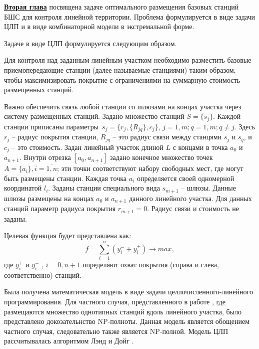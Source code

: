 
  




\underline{\textbf{Вторая глава}} посвящена задаче оптимального размещения базовых станций БШС для контроля линейной территории. Проблема формулируется в виде задачи ЦЛП и в виде комбинаторной модели в экстремальной форме.

Задаче в виде ЦЛП формулируется следующим образом. 

Для контроля над заданным линейным участком необходимо разместить базовые приемопередающие станции (далее называемые станциями) таким образом, чтобы максимизировать покрытие с ограничениями на суммарную стоимость размещенных станций.



Важно обеспечить связь любой станции со шлюзами на концах участка через систему размещенных станций. Задано множество станций $S = \{s_j\}$. Каждой станции приписаны параметры $s_j = \{r_j, \{R_{jq}\}, c_j \}$, $j = \overline{1,m}; q = \overline{1,m}; q \neq j$. Здесь $r_j$ -- радиус покрытия станции, $R_{jq}$ -- это радиус связи между станцями $s_j$ и $s_q$, и $c_j$ -- это стоимость. Задан линейный участок длиной $L$ с концами в точка $a_0$ и $a_{n+1}$. Внутри  отрезка $[a_0, a_{n+1}]$ задано конечное множество точек $A=\{a_i\}, i=\overline{1,n}$; эти точки соответствуют набору свободных мест, где могут быть размещены станции. Каждая точка $a_i$ определяется своей одномерной координатой $l_i$. Заданы станции специального вида $s_{m+1}$ -- шлюзы. Данные шлюзы размещены на концах $a_0$ и $a_{n+1}$ данного линейного участка. Для данных станций параметр радиуса покрытия $r_{m+1}=0$. Радиус связи и стоимость не заданы.

Целевая функция будет представлена как:
$$
  f =  \sum\limits_{i=1}^n (y_i^- + y_i^+) \rightarrow max,
$$
где $y_i^+$ и $y_i^-$ , $i= \overline{0,n+1}$ определяют охват покрытия (справа и слева, соответственно) станций.

Была получена математическая модель в виде задачи целлочисленного-линейного программирования. Для частного случая, представленного в работе \cite{Ivanov2018}, где размещаются множество однотипных станций вдоль линейного участка, было представлено докозательнство NP-полноты. Данная модель является обощением частного случая, следовательно также является NP-полной. Модель ЦЛП рассчитывалась алгоритмом Лэнд и Дойг \cite{Land1960}. 

